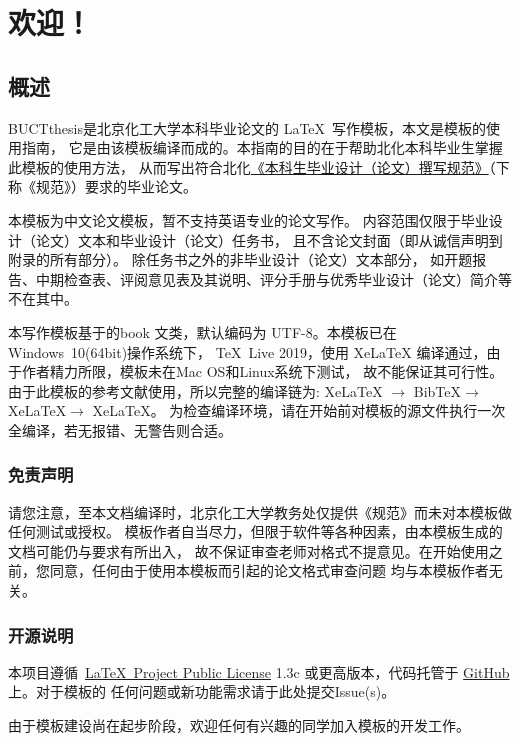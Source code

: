 \chapter{欢迎！}
\section{概述}
BUCTthesis是北京化工大学本科毕业论文的 \LaTeX\ 写作模板，本文是模板的使用指南，
它是由该模板编译而成的。本指南的目的在于帮助北化本科毕业生掌握此模板的使用方法，
从而写出符合北化\href{https://jiaowuchu.buct.edu.cn/2018/1009/c515a22046/page.htm}%
{《本科生毕业设计（论文）撰写规范》}（下称《规范》）要求的毕业论文。

本模板为中文论文模板，暂不支持英语专业的论文写作。
内容范围仅限于毕业设计（论文）文本和毕业设计（论文）任务书，
且不含论文封面（即从诚信声明到附录的所有部分）。
除任务书之外的非毕业设计（论文）文本部分，
如开题报告、中期检查表、评阅意见表及其说明、评分手册与优秀毕业设计（论文）简介等不在其中。


本写作模板基于\CTeX{}的book 文类，默认编码为 UTF-8。本模板已在Windows\ 10(64bit)操作系统下，
\TeX\ Live 2019，使用 XeLaTeX 编译通过，由于作者精力所限，模板未在Mac OS和Linux系统下测试，
故不能保证其可行性。由于此模板的参考文献使用\BibTeX{}，所以完整的编译链为:
XeLaTeX $\to$ BibTeX{}$\to$ XeLaTeX{}$\to$ XeLaTeX{}。
为检查编译环境，请在开始前对模板的源文件执行一次全编译，若无报错、无警告则合适。

\subsection{免责声明}
请您注意，至本文档编译时，北京化工大学教务处仅提供《规范》而未对本模板做任何测试或授权。
模板作者自当尽力，但限于软件等各种因素，由本模板生成的文档可能仍与要求有所出入，
故不保证审查老师对格式不提意见。在开始使用之前，您同意，任何由于使用本模板而引起的论文格式审查问题
均与本模板作者无关。

\subsection{开源说明}
本项目遵循~\href{https://www.latex-project.org/lppl.txt}{\LaTeX\ Project Public License} 1.3c
或更高版本，代码托管于 \href{https://github.com/Miracle0565/BUCTthesis}{GitHub} 上。对于模板的
任何问题或新功能需求请于此处提交Issue(s)。

由于模板建设尚在起步阶段，欢迎任何有兴趣的同学加入模板的开发工作。

